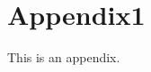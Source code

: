 \documentclass[./mainBiblatex]{subfiles}
\begin{document}
\section{Appendix1}
This is an appendix.

\ifSubfilesClassLoaded{
  \newpage
  \printbibliography
}{}
\end{document}
